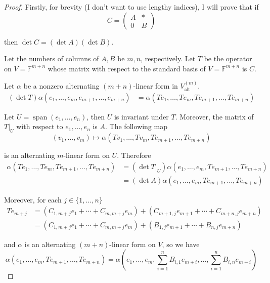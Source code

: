 \begin{proof}
    Firstly, for brevity (I don't want to use lengthy indices), I will prove that if
    \[
        C = \begin{pmatrix}
            A & * \\
            0 & B
        \end{pmatrix}
    \]

    then $\det C = (\det A)(\det B)$.

    Let the numbers of columns of $A, B$ be $m, n$, respectively. Let $T$ be the operator on $V = \mathbb{F}^{m+n}$ whose matrix with respect to the standard basis of $V = \mathbb{F}^{m+n}$ is $C$.

    Let $\alpha$ be a nonzero alternating $(m+n)$-linear form in $V^{(m)}_{\text{alt}}$.
    \begin{align*}
        (\det T)\alpha(e_{1}, \ldots, e_{m}, e_{m+1}, \ldots, e_{m+n}) & = \alpha(Te_{1}, \ldots, Te_{m}, Te_{m+1}, \ldots, Te_{m+n})
    \end{align*}

    Let $U = \operatorname{span}(e_{1}, \ldots, e_{n})$, then $U$ is invariant under $T$. Moreover, the matrix of $T\vert_{U}$ with respect to $e_{1}, \ldots, e_{n}$ is $A$. The following map
    \[
        (v_{1}, \ldots, v_{m})\mapsto \alpha(Tv_{1}, \ldots, Tv_{m}, Te_{m+1}, \ldots, Te_{m+n})
    \]

    is an alternating $m$-linear form on $U$. Therefore
    \begin{align*}
        \alpha(Te_{1}, \ldots, Te_{m}, Te_{m+1}, \ldots, Te_{m+n}) & = (\det T\vert_U)\alpha(e_{1}, \ldots, e_{m}, Te_{m+1}, \ldots, Te_{m+n}) \\
                                                                   & = (\det A)\alpha(e_{1}, \ldots, e_{m}, Te_{m+1}, \ldots, Te_{m+n})
    \end{align*}

    Moreover, for each $j\in\{1,\ldots,n\}$
    \begin{align*}
        Te_{m+j} & = (C_{1,m+j}e_{1} + \cdots + C_{m, m+j}e_{m}) + (C_{m+1,j}e_{m+1} + \cdots + C_{m+n,j}e_{m+n}) \\
                 & = (C_{1,m+j}e_{1} + \cdots + C_{m, m+j}e_{m}) + (B_{1,j}e_{m+1} + \cdots + B_{n,j}e_{m+n})
    \end{align*}

    and $\alpha$ is an alternating $(m+n)$-linear form on $V$, so we have
    \[
        \alpha(e_{1}, \ldots, e_{m}, Te_{m+1}, \ldots, Te_{m+n}) = \alpha(e_{1}, \ldots, e_{m}, \sum^{n}_{i=1}B_{i,1}e_{m+i}, \ldots, \sum^{n}_{i=1}B_{i,n}e_{m+i})
    \]


\end{proof}
